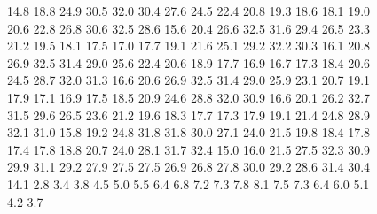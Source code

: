 \begin{figure}[hbt]
{14.8  18.8  24.9  30.5  32.0  30.4  27.6  24.5  22.4  20.8  19.3  18.6  18.1  19.0  20.6  22.8  26.8  30.6  32.5  28.6  
15.6  20.4  26.6  32.5  31.6  29.4  26.5  23.3  21.2  19.5  18.1  17.5  17.0  17.7  19.1  21.6  25.1  29.2  32.2  30.3  
16.1  20.8  26.9  32.5  31.4  29.0  25.6  22.4  20.6  18.9  17.7  16.9  16.7  17.3  18.4  20.6  24.5  28.7  32.0  31.3  
16.6  20.6  26.9  32.5  31.4  29.0  25.9  23.1  20.7  19.1  17.9  17.1  16.9  17.5  18.5  20.9  24.6  28.8  32.0  30.9  
16.6  20.1  26.2  32.7  31.5  29.6  26.5  23.6  21.2  19.6  18.3  17.7  17.3  17.9  19.1  21.4  24.8  28.9  32.1  31.0  
15.8  19.2  24.8  31.8  31.8  30.0  27.1  24.0  21.5  19.8  18.4  17.8  17.4  17.8  18.8  20.7  24.0  28.1  31.7  32.4  
15.0  16.0  21.5  27.5  32.3  30.9  29.9  31.1  29.2  27.9  27.5  27.5  26.9  26.8  27.8  30.0  29.2  28.6  31.4  30.4  
14.1  2.8  3.4  3.8  4.5  5.0  5.5  6.4  6.8  7.2  7.3  7.8  8.1  7.5  7.3  6.4  6.0  5.1  4.2  3.7  

                }
\end{figure}
% 